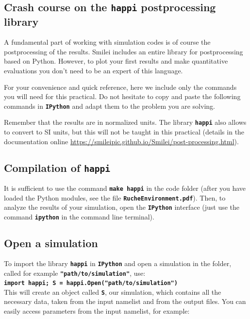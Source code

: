 \documentclass[a4paper,12pt]{extarticle}
\newcommand{\smilei}{{\sc Smilei}\xspace}
\newcommand{\commandline}[1]{\texttt{\textbf{#1}}}
\begin{document}
\begin{appendices}
\section{Crash course on the \commandline{happi} postprocessing library}\label{happi}
A fundamental part of working with simulation codes is of course the postprocessing of the results. \smilei includes an entire library for postprocessing based on Python. However, to  plot your first results and make quantitative evaluations you don't need to be an expert of this language.

For your convenience and quick reference, here we include only the commands you will need for this practical. Do not hesitate to copy and paste the following commands in \commandline{IPython} and adapt them to the problem you are solving.

Remember that the results are in normalized units. The library \commandline{happi} also allows to convert to SI units, but this will not be taught in this practical (details in the documentation online \url{https://smileipic.github.io/Smilei/post-processing.html}).

\subsection*{Compilation of \commandline{happi}}
It is sufficient to use the command \commandline{make happi} in the code folder (after you have loaded the Python modules, see the file \commandline{RucheEnvironment.pdf}). Then, to analyze the results of your simulation, open the \commandline{IPython} interface (just use the command \commandline{ipython} in the command line terminal). 

\subsection*{Open a simulation}
To import the library \commandline{happi} in \commandline{IPython} and open a simulation in the folder,  called for example \commandline{"path/to/simulation"}, use:\\

\commandline{import happi; S =  happi.Open("path/to/simulation")}\\

This will create an object called \commandline{S}, our simulation, which contains all the necessary data, taken from the input namelist and from the output files. You can easily access parameters from the input namelist, for  example:\\


\end{appendices}
\end{document}
